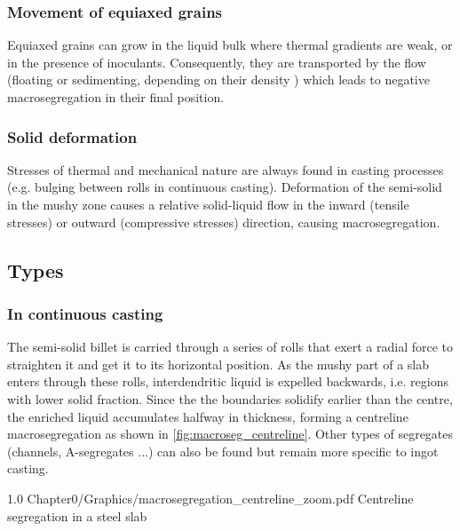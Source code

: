 \subsubsection*{Movement of equiaxed grains}
%
Equiaxed grains can grow in the liquid bulk where thermal gradients are weak, or in the presence of inoculants. 
Consequently, they are transported by the flow (floating or sedimenting, depending on their density 
\citep{beckermann_modelling_2002}) which leads to negative macrosegregation in their final position.
%
%
\subsubsection{Solid deformation} 
%
Stresses of thermal and mechanical nature are always found in casting processes 
(e.g. bulging between rolls in continuous casting). 
Deformation of the semi-solid in the mushy zone causes a relative solid-liquid 
flow in the inward (tensile stresses) or outward (compressive stresses) direction, causing macrosegregation.
%
%
\subsection{Types}
%
\subsubsection*{In continuous casting}
%
The semi-solid billet is carried through a series of rolls that exert a radial force to straighten it and get it to its horizontal position.
As the mushy part of a slab enters through these rolls, interdendritic liquid is expelled backwards, i.e. regions with lower solid fraction.
Since the the boundaries solidify earlier than the centre, the enriched liquid accumulates halfway in thickness, forming a centreline macrosegregation
as shown in \cref{fig:macroseg_centreline}. Other types of segregates (channels, A-segregates ...) can also be found but remain more specific to ingot casting. 
\begin{figureth}
{1.0}
{Chapter0/Graphics/macrosegregation_centreline_zoom.pdf}
{Centreline segregation in a steel slab \citep{beckermann_modelling_2002}}
\label{fig:macroseg_centreline}
\end{figureth}
%
%
